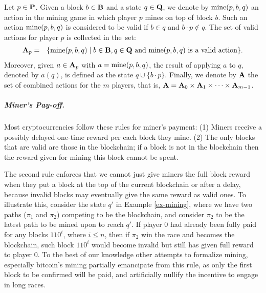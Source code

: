 Let $p \in \mathbf{P}$. Given a block $b \in \mathbf{B}$ and a state $q \in \mathbf{Q}$, we denote by $\text{\rm mine}(p,b,q)$ an action in the mining game in which player $p$ mines on top of block $b$. Such an action $\text{\rm mine}(p,b,q)$ is considered to be valid if $b \in q$ and $b\cdot p \not\in q$. The set of valid actions for player $p$ is collected in the~set:
\begin{eqnarray*}
\mathbf{A}_p & = & \{ \text{\rm mine}(p,b,q) \mid b \in \mathbf{B}, q \in \mathbf{Q} \text{ and } \text{\rm mine}(p,b,q) \text{ is a valid action}\}.
\end{eqnarray*}
Moreover, given $a \in \mathbf{A}_p$ with $a = \text{\rm mine}(p,b,q)$, the result of applying $a$ to $q$, denoted by $a(q)$, is defined as the state $q \cup \{b \cdot p\}$. Finally, we denote by $\mathbf{A}$ the set of combined actions for the $m$ players, that is, $\mathbf{A} = \mathbf{A}_0 \times \mathbf{A}_1 \times \cdots \times \mathbf{A}_{m-1}$.

\subparagraph*{Miner's Pay-off.}
Most cryptocurrencies follow these rules for miner's payment:
%
(1) Miners receive a possibly delayed one-time reward per each block they mine. %
%
(2) The only blocks that are valid are those in the blockchain; if a block is not in the blockchain then the reward given for mining this block cannot be spent. 

The second rule enforces that we cannot just give miners the full block reward when they put a block at the top of the current blockchain or after a delay, because invalid blocks may eventually give the same reward as valid ones. To illustrate this, consider the state $q'$ in Example \ref{ex-mining}, where we have two paths ($\pi_1$ and $\pi_2$) competing to be the blockchain, and consider $\pi_2$ to be the latest path to be mined upon to reach $q'$. If player $0$ had already been fully paid for any blocks $110^i$, where $i \leq n$, then if $\pi_2$ win the race and becomes the blockchain, such block $110^i$ would become invalid but still has given full reward to player $0$. To the best of our knowledge other attempts to formalize mining, especially bitcoin's mining partially emancipate from this rule, as only the first block to be confirmed will be paid, and artificially nullify the incentive to engage in long races.

